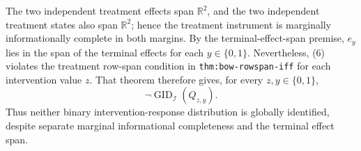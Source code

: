 The two independent treatment effects span \(\mathbb R^2\), and the two independent treatment states also span \(\mathbb R^2\); hence the treatment instrument is marginally informationally complete in both margins.  By the terminal-effect-span premise, \(e_y\) lies in the span of the terminal effects for each \(y\in\{0,1\}\).  Nevertheless, (6) violates the treatment row-span condition in \texttt{thm:bow-rowspan-iff} for each intervention value \(z\).  That theorem therefore gives, for every \(z,y\in\{0,1\}\),
\[
 \neg\operatorname{GID}_{\mathcal I}(Q_{z,y}).
\]
Thus neither binary intervention-response distribution is globally identified, despite separate marginal informational completeness and the terminal effect span.